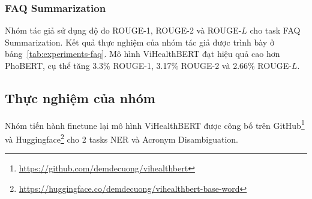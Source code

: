 \subsubsection{FAQ Summarization}
Nhóm tác giả sử dụng độ đo ROUGE-1, ROUGE-2 và ROUGE-$L$ cho task FAQ Summarization. Kết quả thực nghiệm của nhóm tác giả được trình bày ở bảng~\ref{tab:experiments-faq}. Mô hình ViHealthBERT đạt hiệu quả cao hơn PhoBERT, cụ thể tăng 3.3\% ROUGE-1, 3.17\% ROUGE-2 và 2.66\% ROUGE-$L$. 

\begin{table}
\centering
{}
\caption{Kết quả thực nghiệm của nhóm tác giả với task FAQ Summarization\cite{minh-EtAl:2022:LREC}. * là bộ ngữ liệu huấn luyện của PhoBERT, \textit{our} và \textit{TF} là các bộ ngữ liệu huấn luyện đã nêu trong phần Ngữ liệu huấn luyện.}
\label{tab:experiments-faq}
\end{table}

\subsection{Thực nghiệm của nhóm}
Nhóm tiến hành finetune lại mô hình ViHealthBERT được công bố trên GitHub\footnote{\href{https://github.com/demdecuong/vihealthbert}{https://github.com/demdecuong/vihealthbert}} và Huggingface\footnote{\href{https://huggingface.co/demdecuong/vihealthbert-base-word}{https://huggingface.co/demdecuong/vihealthbert-base-word}} cho 2 tasks NER và Acronym Disambiguation.

